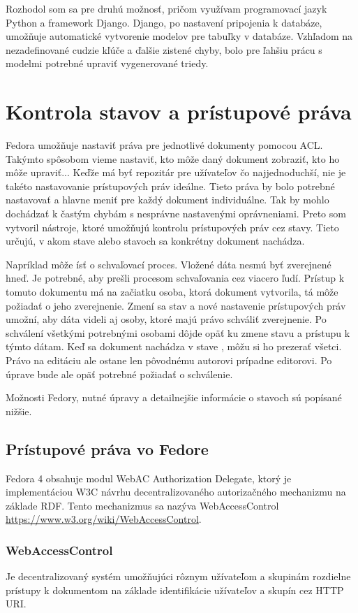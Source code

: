 \documentclass[thesis=M,slovak]{FITthesis}[2013/05/06]
\begin{document}
Rozhodol som sa pre druhú možnosť, pričom využívam programovací jazyk Python a framework Django. Django, po nastavení pripojenia k databáze, umožňuje automatické vytvorenie modelov pre tabuľky v databáze. Vzhľadom na nezadefinované cudzie kľúče a ďalšie zistené chyby, bolo pre ľahšiu prácu s modelmi potrebné upraviť vygenerované triedy.

\section{Kontrola stavov a prístupové práva} \label{stavy}
Fedora umožňuje nastaviť práva pre jednotlivé dokumenty pomocou ACL. Takýmto spôsobom vieme nastaviť, kto môže daný dokument zobraziť, kto ho môže upraviť... Keďže má byť repozitár pre užívateľov čo najjednoduchší, nie je takéto nastavovanie prístupových práv ideálne. Tieto práva by bolo potrebné nastavovať a hlavne meniť pre každý dokument individuálne. Tak by mohlo dochádzať k častým chybám s nesprávne nastavenými oprávneniami. Preto som vytvoril nástroje, ktoré umožňujú kontrolu prístupových práv cez stavy. Tieto určujú, v akom stave alebo stavoch sa konkrétny dokument nachádza.

Napríklad môže ísť o schvaľovací proces. Vložené dáta nesmú byť zverejnené hneď. Je potrebné, aby prešli procesom schvaľovania cez viacero ľudí. Prístup k tomuto dokumentu má na začiatku osoba, ktorá dokument vytvorila, tá môže požiadať o jeho zverejnenie. Zmení sa stav a nové nastavenie prístupových práv umožní, aby dáta videli aj osoby, ktoré majú právo schváliť zverejnenie. Po schválení všetkými potrebnými osobami dôjde opäť ku zmene stavu a prístupu k týmto dátam. Keď sa dokument nachádza v stave , môžu si ho prezerať všetci. Právo na editáciu ale ostane len pôvodnému autorovi prípadne editorovi. Po úprave bude ale opäť potrebné požiadať o schválenie.

Možnosti Fedory, nutné úpravy a detailnejšie informácie o stavoch sú popísané nižšie.

\subsection{Prístupové práva vo Fedore}
Fedora 4 obsahuje modul WebAC Authorization Delegate, ktorý je implementáciou W3C návrhu decentralizovaného autorizačného mechanizmu na základe RDF. Tento mechanizmus sa nazýva WebAccessControl \url{https://www.w3.org/wiki/WebAccessControl}.

\subsubsection{WebAccessControl}
Je decentralizovaný systém umožňujúci rôznym užívateľom a skupinám rozdielne prístupy k dokumentom na základe identifikácie užívateľov a skupín cez HTTP URI. 
\end{document}
